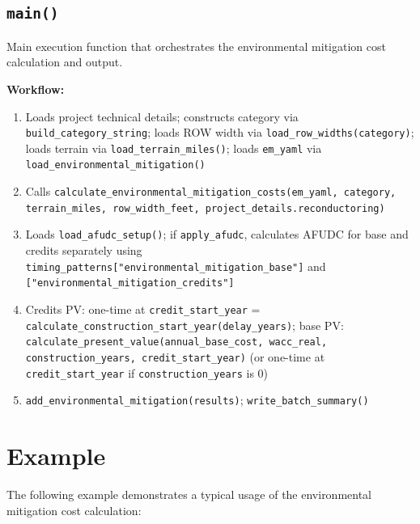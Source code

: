 \documentclass[ctcc_full_documentation.tex]{subfiles}
\begin{document}
\subsection{\texttt{main()}}

Main execution function that orchestrates the environmental mitigation cost calculation and output.

\textbf{Workflow:}
\begin{enumerate}
    \item Loads project technical details; constructs category via \texttt{build\_category\_string}; loads ROW width via \texttt{load\_row\_widths(category)}; loads terrain via \texttt{load\_terrain\_miles()}; loads \texttt{em\_yaml} via \texttt{load\_environmental\_mitigation()}
    \item Calls \texttt{calculate\_environmental\_mitigation\_costs(em\_yaml, category, terrain\_miles, row\_width\_feet, project\_details.reconductoring)}
    \item Loads \texttt{load\_afudc\_setup()}; if \texttt{apply\_afudc}, calculates AFUDC for base and credits separately using \texttt{timing\_patterns["environmental\_mitigation\_base"]} and \texttt{["environmental\_mitigation\_credits"]}
    \item Credits PV: one-time at \texttt{credit\_start\_year} = \texttt{calculate\_construction\_start\_year(delay\_years)}; base PV: \texttt{calculate\_present\_value(annual\_base\_cost, wacc\_real, construction\_years, credit\_start\_year)} (or one-time at \texttt{credit\_start\_year} if \texttt{construction\_years} is 0)
    \item \texttt{add\_environmental\_mitigation(results)}; \texttt{write\_batch\_summary()}
\end{enumerate}

\section{Example}

The following example demonstrates a typical usage of the environmental mitigation cost calculation:
\end{document}
